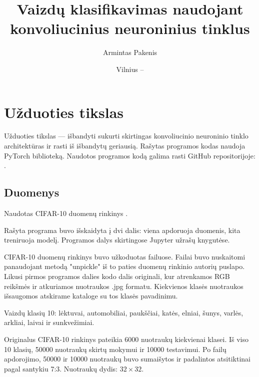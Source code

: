 \documentclass{VUMIFPSbakalaurinis}
\institute{Informatikos institutas}  %
\title{Vaizdų klasifikavimas naudojant konvoliucinius neuroninius tinklus}
\author{Armintas Pakenis}
\date{Vilnius – \the\year}
\begin{document}
\maketitle


\tableofcontents

\section{Užduoties tikslas}
Užduoties tikslas — išbandyti sukurti skirtingas konvoliucinio neuroninio 
tinklo architektūras ir rasti iš išbandytų geriausią. Rašytas programos
kodas naudoja PyTorch biblioteką.
Naudotos programos kodą 
galima rasti GitHub repositorijoje: 
\href{https://github.com/ArmintasP/Computational-intelligence/tree/main/Lab4}{\color{cyan}{https://github.com/ArmintasP/Computational-intelligence/tree/main/Lab4}}.

\subsection{Duomenys}
Naudotas CIFAR-10 duomenų rinkinys
\href{https://www.cs.toronto.edu/~kriz/cifar.html}{\color{cyan}{https://www.cs.toronto.edu/~kriz/cifar.html}}.

Rašyta programa buvo išskaidyta į dvi dalis: viena apdoruoja duomenis,
kita treniruoja modelį. Programos dalys skirtingose Jupyter
užrašų knygutėse.

CIFAR-10 duomenų rinkinys buvo užkoduotas failuose. Failai buvo
nuskaitomi panaudojant metodą "unpickle" iš to paties 
duomenų rinkinio autorių puslapo. Likusi pirmos programos dalies
kodo dalis originali, kur atrenkamos RGB reikšmės ir atkuriamos nuotraukos .jpg formatu.
Kiekvienos klasės nuotraukos išsaugomos atskirame kataloge su tos
klasės pavadinimu.

Vaizdų klasių 10: lėktuvai, automobiliai, paukščiai,
katės, elniai, šunys, varlės, arkliai, laivai ir sunkvežimiai.

Originalus CIFAR-10 rinkinys pateikia 6000 nuotraukų kiekvienai klasei.
Iš viso 10 klasių, 50000 nuotraukų skirtų mokymui ir 10000 testavimui.
Po failų apdorojimo, 50000 ir 10000 nuotraukų buvo sumaišytos ir
padalintos atsitiktinai pagal santykiu 7:3. Nuotraukų dydis: $32 \times 32$.
\end{document}
